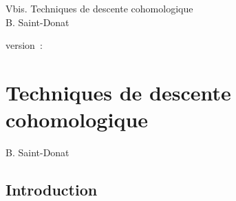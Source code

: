 \documentclass[10pt]{../fichiers-configuration-latex/smfart}
\begin{document}
\begin{center}
Vbis. Techniques de descente cohomologique\\
B. Saint-Donat
\end{center}

version : \showgitstatus{}
\tableofcontents

\else
\chapter{Techniques de descente cohomologique}
\begin{center}
B. Saint-Donat
\end{center}
\fi

\setcounter{pageoriginal}{83}


\let\cosk=\cosq
\let\Ysheaf=\sheaf

\section*{Introduction}
\end{document}
